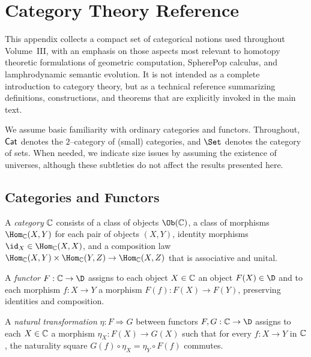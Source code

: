 
\chapter{Category Theory Reference}
\label{appJ-category-theory}

This appendix collects a compact set of categorical notions used throughout
Volume~III, with an emphasis on those aspects most relevant to homotopy
theoretic formulations of geometric computation, SpherePop calculus,
and lamphrodynamic semantic evolution.  It is not intended as a complete
introduction to category theory, but as a technical reference summarizing
definitions, constructions, and theorems that are explicitly invoked in the
main text.

We assume basic familiarity with ordinary categories and functors.  Throughout,
$\mathsf{Cat}$ denotes the $2$--category of (small) categories, and $\Set$ denotes the
category of sets.  When needed, we indicate size issues by assuming the
existence of universes, although these subtleties do not affect the results
presented here.

\section{Categories and Functors}

\begin{definition}
A \emph{category} $\mathbb{C}$ consists of a class of objects $\Ob(\C)$, a class of
morphisms $\Hom_\C(X,Y)$ for each pair of objects $(X,Y)$, identity morphisms
$\id_X \in \Hom_\C(X,X)$, and a composition law
$\Hom_\C(X,Y)\times\Hom_\C(Y,Z)\to\Hom_\C(X,Z)$
that is associative and unital.
\end{definition}

\begin{definition}
A \emph{functor} $F:\C\to\D$ assigns to each object $X\in\mathbb{C}$ an object $F(X)\in\D$
and to each morphism $f:X\to Y$ a morphism $F(f):F(X)\to F(Y)$, preserving
identities and composition.
\end{definition}

\begin{definition}
A \emph{natural transformation} $\eta:F\Rightarrow G$ between functors
$F,G:\C\to\D$ assigns to each $X\in\mathbb{C}$ a morphism
$\eta_X: F(X)\to G(X)$ such that for every $f:X\to Y$ in $\mathbb{C}$, the naturality
square $G(f)\circ\eta_X = \eta_Y\circ F(f)$ commutes.
\end{definition}

